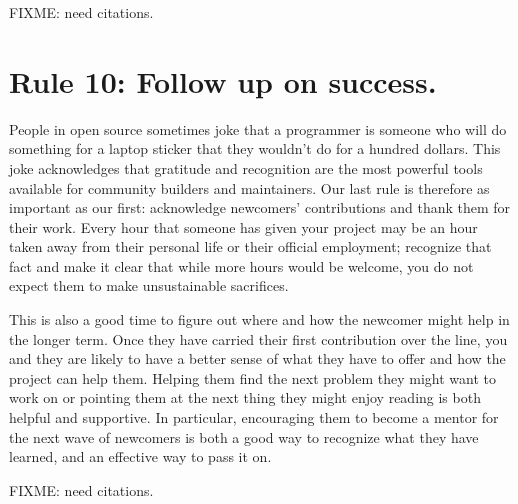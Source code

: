 \documentclass[10pt,letterpaper]{article}
\newcommand{\rulemajor}[1]{\section*{#1}}
\begin{document}
FIXME: need citations.

\rulemajor{Rule 10: Follow up on success.}

People in open source sometimes joke that
a programmer is someone who will do something for a laptop sticker
that they wouldn't do for a hundred dollars.
This joke acknowledges that gratitude and recognition are the most powerful tools available for community builders and maintainers.
Our last rule is therefore as important as our first:
acknowledge newcomers' contributions and thank them for their work.
Every hour that someone has given your project may be an hour taken away from their personal life
or their official employment;
recognize that fact
and make it clear that while more hours would be welcome,
you do not expect them to make unsustainable sacrifices.

This is also a good time to figure out where and how the newcomer might help in the longer term.
Once they have carried their first contribution over the line,
you and they are likely to have a better sense of what they have to offer
and how the project can help them.
Helping them find the next problem they might want to work on
or pointing them at the next thing they might enjoy reading
is both helpful and supportive.
In particular,
encouraging them to become a mentor for the next wave of newcomers
is both a good way to recognize what they have learned,
and an effective way to pass it on.

FIXME: need citations.


\end{document}
